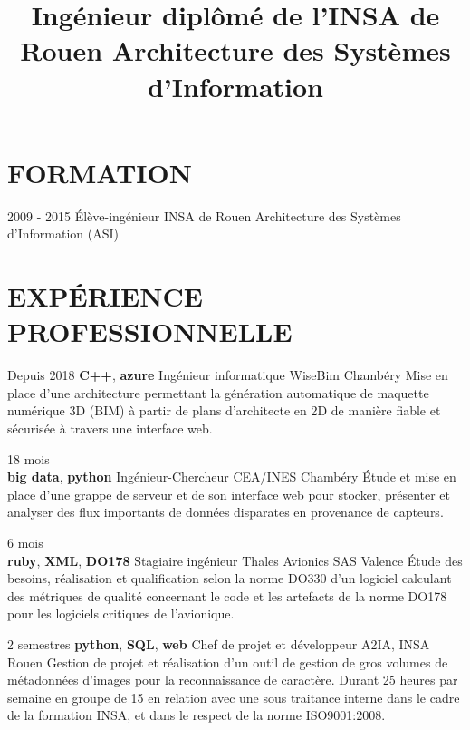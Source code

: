 \documentclass[11pt,a4paper]{moderncv}
\title{
  Ingénieur diplômé de l'INSA de Rouen \newline{}
  Architecture des Systèmes d'Information
}
\begin{document}
  \maketitle

  \section{FORMATION}

  \cventry
    {2009 - 2015}
    {Élève-ingénieur}
    {INSA de Rouen}
    {Architecture des Systèmes d'Information (ASI)}
    {}{}

  \section{EXPÉRIENCE PROFESSIONNELLE}

  \cventry
    {Depuis 2018 \textbf{C++}, \textbf{azure}}
    {Ingénieur informatique}
    {WiseBim}
    {Chambéry}
    {}{
      Mise en place d'une architecture permettant la génération automatique de
      maquette numérique 3D (BIM) à partir de plans d'architecte en 2D de
      manière fiable et sécurisée à travers une interface web.
    }

  \cventry
    {18 mois \\ \textbf{big data}, \textbf{python}}
    {Ingénieur-Chercheur}
    {CEA/INES}
    {Chambéry}
    {}{
      Étude et mise en place d'une grappe de serveur et de son interface web
      pour stocker, présenter et analyser des flux importants de données
      disparates en provenance de capteurs.
    }

  \cventry
    {6 mois \\ \textbf{ruby}, \textbf{XML}, \textbf{DO178}}
    {Stagiaire ingénieur}
    {Thales Avionics SAS}
    {Valence}
    {}{
      Étude des besoins, réalisation et qualification selon la norme DO330
      d'un logiciel calculant des métriques de qualité concernant le code et
      les artefacts de la norme DO178 pour les logiciels critiques de
      l'avionique.
    }

  \cventry
    {2 semestres \textbf{python}, \textbf{SQL}, \textbf{web}}
    {Chef de projet et développeur}
    {A2IA, INSA}
    {Rouen}
    {}{
      Gestion de projet et réalisation d'un outil de gestion de gros volumes de
      métadonnées d'images pour la reconnaissance de caractère. Durant 25
      heures par semaine en groupe de 15 en relation avec une sous traitance
      interne dans le cadre de la formation INSA, et dans le respect de la
      norme ISO9001:2008.
    }
\end{document}
